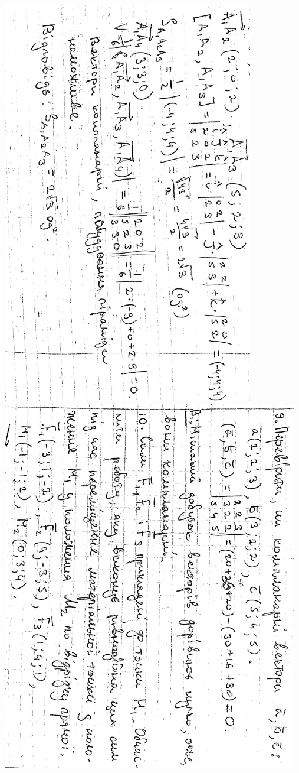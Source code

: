 \documentclass{article}
\begin{document}
\includegraphics[width=11cm,angle=90]{ons/12.jpg}\\
\includegraphics[width=13cm,angle=90]{ons/13.jpg}\\
\end{document}
